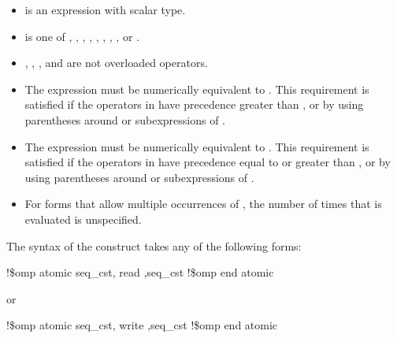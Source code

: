 {{{{\begin{itemize}
\item {} is an expression with scalar type. 

\item {} is one of \code{+}, \code{*}, \code{-}, \code{/}, 
\code{\&}, \code{\^}, \code{|}, \code{\textless \hspace{0.05em}\textless}, or 
\code{\textgreater \hspace{0.05em}\textgreater}.

\item {}, \code{=}, \code{++}, and \code{\--\--} are not overloaded operators.

\item The expression    must be numerically equivalent to 
  . This 
requirement is satisfied if the operators in  have precedence greater than , 
or by using parentheses around  or subexpressions of .

\item The expression    must be numerically equivalent to 
  . This 
requirement is satisfied if the operators in  have precedence equal to or greater 
than , or by using parentheses around  or subexpressions of .

\item For forms that allow multiple occurrences of , the number of times that  is 
evaluated is unspecified.
\end{itemize}
\ccppspecificend

\begin{samepage}
\fortranspecificstart
The syntax of the  construct takes any of the following forms: 

\begin{boxedcode}
!\$omp atomic \plc{[}seq\_cst\plc{[},\plc{]]} read \plc{[[},\plc{]}seq\_cst\plc{]}
\plc{[}!\$omp end atomic\plc{]}
\end{boxedcode}
\end{samepage}

or

\begin{boxedcode}
!\$omp atomic \plc{[}seq\_cst\plc{[},\plc{]]} write \plc{[[},\plc{]}seq\_cst\plc{]}
\plc{[}!\$omp end atomic\plc{]}
\end{boxedcode}

}}}}
